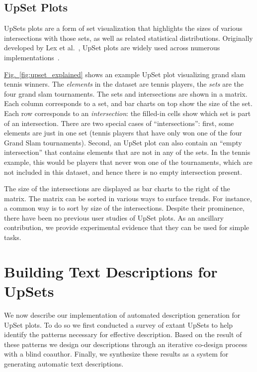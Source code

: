 \documentclass{egpubl}
\newcommand{\etal}{et al.}
\newcommand{\figref}[1]{\hyperref[#1]{Fig.~\ref*{#1}}}
\begin{document}
\subsection{UpSet Plots}

UpSets plots are a form of set visualization that highlights the sizes of various intersections with those sets, as well as related statistical distributions.
Originally developed by Lex \etal{}~\cite{lex_upset_2014}, UpSet plots are widely used across numerous implementations~\cite{lex_implementations_2024}.

\figref{fig:upset_explained} shows an example UpSet plot visualizing grand slam tennis winners. The \textit{elements} in the dataset are tennis players, the \textit{sets} are the four grand slam tournaments. The sets and intersections are shown in a matrix. Each column corresponds to a set, and bar charts on top show the size of the set. Each row corresponds to an \textit{intersection}: the filled-in cells show which set is part of an intersection. There are two special cases of ``intersections'': first, some elements are just in one set (tennis players that have only won one of the four Grand Slam tournaments). Second, an UpSet plot can also contain an ``empty intersection'' that contains elements that are not in any of the sets. In the tennis example, this would be players that never won one of the tournaments, which are not included in this dataset, and hence there is no empty intersection present.

The size of the intersections are displayed as bar charts to the right of the matrix. The matrix can be sorted in various ways to surface trends. For instance, a common way is to sort by size of the intersections.
Despite their prominence, there have been no previous user studies of UpSet plots. As an ancillary contribution, we provide experimental evidence that they can be used for simple tasks.

\section{Building Text Descriptions for UpSets}

We now describe our implementation of automated description generation for UpSet plots. To do so we first conducted a survey of extant UpSets to help identify the patterns necessary for effective description.
Based on the result of these patterns we design our descriptions through an iterative co-design process with a blind coauthor.
Finally, we synthesize these results as a system for generating automatic text descriptions.
\end{document}
